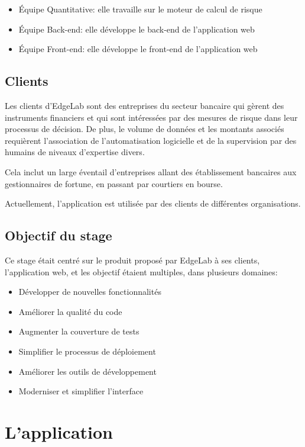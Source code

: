 \documentclass[a4paper,french,12pt]{article}
\begin{document}
	\begin{itemize}
	\item \'Equipe Quantitative: elle travaille sur le moteur de calcul de risque
	\item \'Equipe Back-end: elle développe le back-end de l'application web
	\item \'Equipe Front-end: elle développe le front-end de l'application web
	\end{itemize}

	\subsection{Clients}

		Les clients d'EdgeLab sont des entreprises du secteur bancaire qui gèrent des instruments financiers et qui sont intéressées par des mesures de risque dans leur processus de décision. De plus, le volume de données et les montants associés requièrent l'association de l'automatisation logicielle et de la supervision par des humains de niveaux d'expertise divers.
		
	Cela inclut un large éventail d'entreprises allant des établissement bancaires aux gestionnaires de fortune, en passant par courtiers en bourse.
	
	Actuellement, l'application est utilisée par des clients de différentes organisations. 
	
	\subsection{Objectif du stage}

		Ce stage était centré sur le produit proposé par EdgeLab à ses clients, l'application web, et les objectif étaient multiples, dans plusieurs domaines:
		
	\begin{itemize}
		\item Développer de nouvelles fonctionnalités
		\item Améliorer la qualité du code
		\item Augmenter la couverture de tests
		\item Simplifier le processus de déploiement
		\item Améliorer les outils de développement
		\item Moderniser et simplifier l'interface
	\end{itemize}			

\section{L'application}
\end{document}
